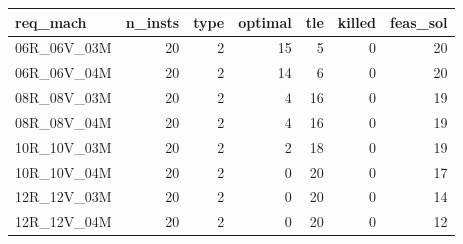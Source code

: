 
\begin{tabular}{lrrrrrr}
\toprule
req\_mach & n\_insts & type & optimal & tle & killed & feas\_sol\\
\midrule
06R\_06V\_03M & 20 & 2 & 15 & 5 & 0 & 20\\
06R\_06V\_04M & 20 & 2 & 14 & 6 & 0 & 20\\
08R\_08V\_03M & 20 & 2 & 4 & 16 & 0 & 19\\
08R\_08V\_04M & 20 & 2 & 4 & 16 & 0 & 19\\
10R\_10V\_03M & 20 & 2 & 2 & 18 & 0 & 19\\
\addlinespace
10R\_10V\_04M & 20 & 2 & 0 & 20 & 0 & 17\\
12R\_12V\_03M & 20 & 2 & 0 & 20 & 0 & 14\\
12R\_12V\_04M & 20 & 2 & 0 & 20 & 0 & 12\\
\bottomrule
\end{tabular}
